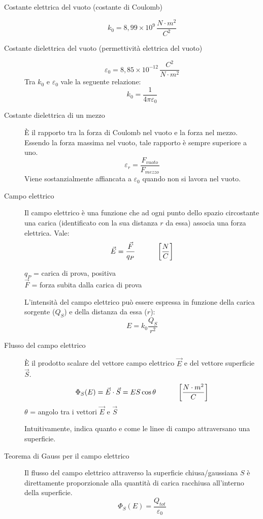 \documentclass[a4paper,11pt,italian]{article}
\begin{document}
\begin{description}
  \item[Costante elettrica del vuoto (costante di Coulomb)] 
  \[ k_0 = 8,99 \times 10^9 \, \frac{N\cdot m^2}{C^2} \]
  
  \item[Costante dielettrica del vuoto (permettività elettrica del vuoto)]
  \[ \varepsilon_0 = 8,85\times 10^{-12} \, \frac{C^2}{N \cdot m^2} \]
  Tra $ k_0 $ e $ \varepsilon_0 $ vale la seguente relazione:
  \[ k_0 = \frac{1}{4 \pi \varepsilon_0} \]
  
  \item[Costante dielettrica di un mezzo] 
  È il rapporto tra la forza di Coulomb nel vuoto e la forza nel mezzo. Essendo la forza massima nel vuoto, tale rapporto è sempre superiore a uno.
  \[ \varepsilon_r = \frac{F_{vuoto}}{F_{mezzo}} \]
  Viene sostanzialmente affiancata a $ \varepsilon_0 $ quando non si lavora nel vuoto.

  \item[Campo elettrico] 
  Il campo elettrico è una funzione che ad ogni punto dello spazio circostante una carica (identificato con la sua distanza $ r $ da essa) associa una forza elettrica. Vale:
  \[ \vec{E}  = \frac{\vec{F}}{q_P} \hspace*{3em} \left[ \frac{N}{C} \right] \]
  \begin{multicols}{2}
  $ q_P $ = carica di prova, positiva\\
  $ \vec{F}  $ = forza subita dalla carica di prova
  \end{multicols}

\begin{soloscientifico} %
  L'intensità del campo elettrico può essere espressa in funzione della carica sorgente ($ Q_S $) e della distanza da essa ($ r $):
  \[ E = k_0 \frac{Q_S}{r^2}  \]
\end{soloscientifico}   %
    
  \item[Flusso del campo elettrico] 
  È il prodotto scalare del vettore campo elettrico $ \vec{E} $ e del vettore superficie $ \vec{S} $.
  \[ \Phi_S(E) = \vec{E} \cdot \vec{S} = ES \cos \theta \hspace*{3em} \left[ \frac{N\cdot m^2}{C} \right] \]
  $ \theta $ = angolo tra i vettori $ \vec{E} $ e $ \vec{S} $
  
  Intuitivamente, indica quanto e come le linee di campo attraversano una superficie.
    
  \item[Teorema di Gauss per il campo elettrico] 
  Il flusso del campo elettrico attraverso la superficie chiusa/gaussiana $ S $ è direttamente proporzionale alla quantità di carica racchiusa all'interno della superficie.
  \[ \Phi_S(E) = \frac{Q_{tot}}{\varepsilon_0} \]


\end{description}
\end{document}
